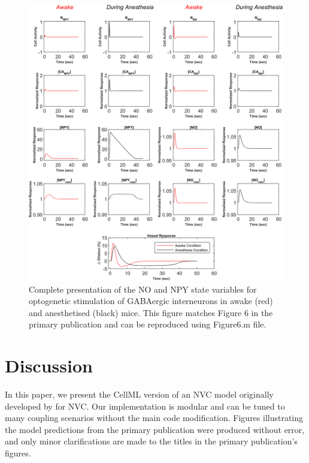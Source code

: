 \documentclass[fleqn,10pt]{physiome}
\begin{document}
\begin{figure}[hbtp]
    \centering
    \includegraphics[scale=0.9, keepaspectratio]{Figure6.png}
    \caption{Complete presentation of the NO and NPY state variables for optogenetic stimulation of GABAergic interneurons in awake (red) and anesthetised (black) mice. This figure matches Figure $6$ in the primary publication and can be reproduced using Figure6.m file.}
    \label{fig:4}
\end{figure}

\section{Discussion}

In this paper, we present the CellML version of an NVC model originally developed by \cite{Sten2020} for NVC. Our implementation is modular and can be tuned to many coupling scenarios without the main code modification. Figures illustrating the model predictions from the primary publication were produced without error, and only minor clarifications are made to the titles in the primary publication's figures.



\end{document}
